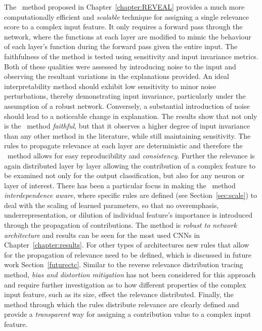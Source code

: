 The \CTC\ method proposed in Chapter~\ref{chapter:REVEAL} provides a much more computationally efficient and \emph{scalable} technique for assigning a single relevance score to a complex input feature. It only requires a forward pass through the network, where the functions at each layer are modified to mimic the behaviour of each layer’s function during the forward pass given the entire input. The faithfulness of the method is tested using sensitivity and input invariance metrics. Both of these qualities were assessed by introducing noise to the input and observing the resultant variations in the explanations provided. An ideal interpretability method should exhibit low sensitivity to minor noise perturbations, thereby demonstrating input invariance, particularly under the assumption of a robust network. Conversely, a substantial introduction of noise should lead to a noticeable
change in explanation. The results show that not only is the \CTC\ method \emph{faithful}, but that it observes a higher degree of input invariance than any other method in the literature, while still maintaining sensitivity. The rules to propagate relevance at each layer are deterministic and therefore the \CTC\ method allows for easy reproducibility and \emph{consistency}. Further the relevance is again distributed layer by layer allowing the contribution of a complex feature to be examined not only for the output classification, but also for any neuron or layer of interest. There has been a particular focus in making the \CTC\ method \emph{interdependence aware}, where specific rules are defined (see Section~\ref{sec:scale}) to deal with the scaling of learned parameters, so that no overemphasis, underrepresentation, or dilution of individual feature's importance is introduced through the propagation of contributions. The method is \emph{robust to network architecture} and results can be seen for the most used CNNs in Chapter~\ref{chapter:results}. For other types of architectures new rules that allow for the propagation of relevance need to be defined, which is discussed in future work Section~\ref{futurectc}. Similar to the reverse relevance distribution tracing method, \emph{bias and distortion mitigation} has not been considered for this approach and require further investigation as to how different properties of the complex input feature, such as its size, effect the relevance distributed. Finally, the method through which the rules distribute relevance are clearly defined and provide a \emph{transparent} way for assigning a contribution value to a complex input feature.

